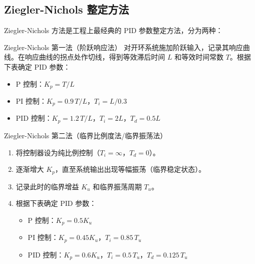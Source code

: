 \subsection{Ziegler-Nichols 整定方法}

Ziegler-Nichols 方法是工程上最经典的 PID 参数整定方法，分为两种：

\begin{myalgorithm}{Ziegler-Nichols 第一法（阶跃响应法）}
对开环系统施加阶跃输入，记录其响应曲线。在响应曲线的拐点处作切线，得到等效滞后时间 $L$ 和等效时间常数 $T$。根据下表确定 PID 参数：
\begin{itemize}
    \item P 控制：$K_p = T/L$
    \item PI 控制：$K_p = 0.9\,T/L$，$T_i = L/0.3$
    \item PID 控制：$K_p = 1.2\,T/L$，$T_i = 2L$，$T_d = 0.5L$
\end{itemize}
\end{myalgorithm}

\begin{myalgorithm}{Ziegler-Nichols 第二法（临界比例度法/临界振荡法）}
\begin{enumerate}
    \item 将控制器设为纯比例控制（$T_i = \infty$，$T_d = 0$）。
    \item 逐渐增大 $K_p$，直至系统输出出现等幅振荡（临界稳定状态）。
    \item 记录此时的临界增益 $K_u$ 和临界振荡周期 $T_u$。
    \item 根据下表确定 PID 参数：
    \begin{itemize}
        \item P 控制：$K_p = 0.5K_u$
        \item PI 控制：$K_p = 0.45K_u$，$T_i = 0.85\,T_u$
        \item PID 控制：$K_p = 0.6K_u$，$T_i = 0.5\,T_u$，$T_d = 0.125\,T_u$
    \end{itemize}
\end{enumerate}
\end{myalgorithm}

